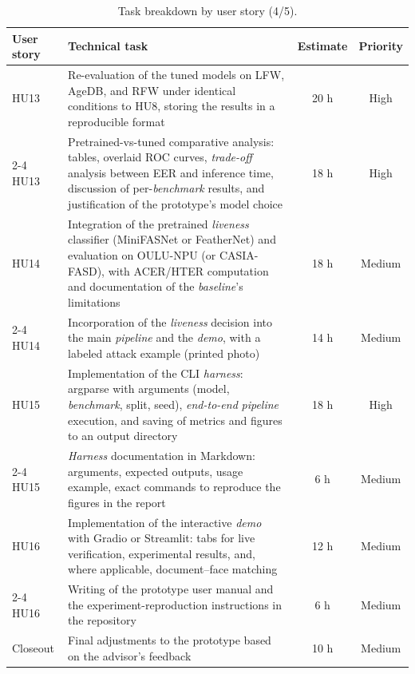 \documentclass[
  11pt, %
]{charter}
\begin{document}
\begin{table}[htpb]
  \centering
  \small
  \renewcommand{\arraystretch}{0.9}
  \caption{Task breakdown by user story (4/5).}
  \begin{tabularx}{\linewidth}{@{}|X|X|c|c|@{}}
    \hline
    \rowcolor[HTML]{C0C0C0}
    User story & Technical task & Estimate & Priority \\ \hline

    HU13 & Re-evaluation of the tuned models on LFW, AgeDB, and RFW under identical conditions to HU8, storing the results in a reproducible format & 20 h & High \\ \cline{2-4}
    HU13 & Pretrained-vs-tuned comparative analysis: tables, overlaid ROC curves, \textit{trade-off} analysis between EER and inference time, discussion of per-\textit{benchmark} results, and justification of the prototype's model choice & 18 h & High \\ \hline

    HU14 & Integration of the pretrained \textit{liveness} classifier (MiniFASNet or FeatherNet) and evaluation on OULU-NPU (or CASIA-FASD), with ACER/HTER computation and documentation of the \textit{baseline}'s limitations & 18 h & Medium \\ \cline{2-4}
    HU14 & Incorporation of the \textit{liveness} decision into the main \textit{pipeline} and the \textit{demo}, with a labeled attack example (printed photo) & 14 h & Medium \\ \hline

    HU15 & Implementation of the CLI \textit{harness}: argparse with arguments (model, \textit{benchmark}, split, seed), \textit{end-to-end} \textit{pipeline} execution, and saving of metrics and figures to an output directory & 18 h & High \\ \cline{2-4}
    HU15 & \textit{Harness} documentation in Markdown: arguments, expected outputs, usage example, exact commands to reproduce the figures in the report & 6 h & Medium \\ \hline

    HU16 & Implementation of the interactive \textit{demo} with Gradio or Streamlit: tabs for live verification, experimental results, and, where applicable, document--face matching & 12 h & Medium \\ \cline{2-4}
    HU16 & Writing of the prototype user manual and the experiment-reproduction instructions in the repository & 6 h & Medium \\ \hline

    Closeout & Final adjustments to the prototype based on the advisor's feedback & 10 h & Medium \\ \hline

  \end{tabularx}
\end{table}
\end{document}
